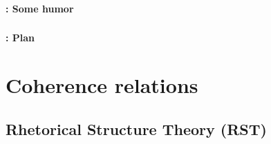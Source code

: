 \documentclass[xcolor=table]{beamer}
\begin{document}
\begin{frame}
	\frametitle{\inserttitle}
	\framesubtitle{\insertshortsubtitle: Some humor}

	\begin{center}
	\end{center}

\end{frame}

\begin{frame}
	\frametitle{\inserttitle}
	\framesubtitle{\insertshortsubtitle: Plan}

	\begin{multicols}{2}
	\tableofcontents
	\end{multicols}

\end{frame}

\section{Coherence relations}

\begin{frame}
	\frametitle{\insertshortsubtitle}
	\framesubtitle{\insertsection}
	
\end{frame}

\subsection{Rhetorical Structure Theory (RST)}
\end{document}
